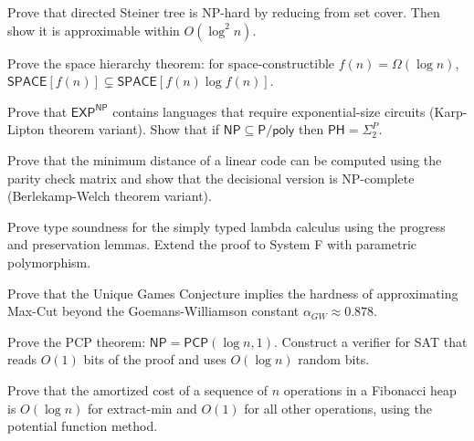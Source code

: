 \documentclass[12pt,a4paper]{exam}
\begin{document}
\begin{questions}
\vspace{0.3cm}

\question[3]
Prove that directed Steiner tree is NP-hard by reducing from set cover. Then show it is approximable within $O(\log^2 n)$.

\vspace{0.3cm}

\question[5]
Prove the space hierarchy theorem: for space-constructible $f(n) = \Omega(\log n)$, $\mathsf{SPACE}[f(n)] \subsetneq \mathsf{SPACE}[f(n) \log f(n)]$.

\vspace{0.3cm}

\question[5]
Prove that $\mathsf{EXP}^{\mathsf{NP}}$ contains languages that require exponential-size circuits (Karp-Lipton theorem variant). Show that if $\mathsf{NP} \subseteq \mathsf{P}/\mathsf{poly}$ then $\mathsf{PH} = \Sigma_2^P$.

\vspace{0.3cm}

\question[6]
Prove that the minimum distance of a linear code can be computed using the parity check matrix and show that the decisional version is NP-complete (Berlekamp-Welch theorem variant).

\vspace{0.3cm}

\question[3]
Prove type soundness for the simply typed lambda calculus using the progress and preservation lemmas. Extend the proof to System F with parametric polymorphism.

\vspace{0.3cm}

\question[2]
Prove that the Unique Games Conjecture implies the hardness of approximating Max-Cut beyond the Goemans-Williamson constant $\alpha_{GW} \approx 0.878$.

\vspace{0.3cm}

\question[4]
Prove the PCP theorem: $\mathsf{NP} = \mathsf{PCP}(\log n, 1)$. Construct a verifier for SAT that reads $O(1)$ bits of the proof and uses $O(\log n)$ random bits.

\vspace{0.3cm}

\question[7]
Prove that the amortized cost of a sequence of $n$ operations in a Fibonacci heap is $O(\log n)$ for extract-min and $O(1)$ for all other operations, using the potential function method.

\vspace{0.3cm}


\end{questions}
\end{document}
